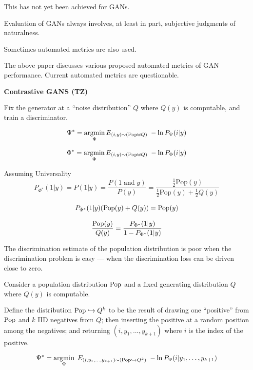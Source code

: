 {\vfill
This has not yet been achieved for GANs.

\vfill
Evaluation of GANs always involves, at least in part, subjective judgments of naturalness.

\vfill
Sometimes automated metrics are also used.

\vfill
The above paper discusses various proposed automated metrics of GAN performance.  Current automated metrics are questionable.

\slide{}
\vfill
\centerline{\bf Contrastive GANS (TZ)}
\vfill\vfill


Fix the generator at a ``noise distribution'' $Q$ where $Q(y)$ is computable, and train a discriminator.

\vfill
{\color{red} $$\Psi^* = \operatorname*{argmin}_\Psi E_{(i,y) \sim (\mathrm{Pop} \uplus Q)}\;-\ln P_\Psi(i|y)$$}


{\color{red} $$\Phi^* = \operatorname*{argmin}_\Phi E_{(i,y) \sim (\mathrm{Pop} \uplus Q)}\;-\ln P_\Phi(i|y)$$}

Assuming Universality
$$P_{\Phi^*}(1|y) = P(1|y) = \frac{P(1\;\mathrm{and}\; y)}{P(y)} = \frac{\frac{1}{2}\mathrm{Pop}(y)}{\frac{1}{2}\mathrm{Pop}(y) + \frac{1}{2}Q(y)}$$

\vfill
$$P_{\Phi^*}(1|y)(\mathrm{Pop}(y) + Q(y)) = \mathrm{Pop}(y)$$

\vfill
{\color{red} $$ \frac{\mathrm{Pop}(y)}{Q(y)} = \frac{P_{\Phi^*}(1|y)}{1-P_{\Phi^*}(1|y)}$$}


The discrimination estimate of the population distribution is poor when the discrimination problem is easy --- when the discrimination loss can be driven close to zero.


Consider a population distribution $\mathrm{Pop}$ and a fixed generating distribution $Q$ where $Q(y)$ is computable.

\vfill
Define the distribution {\color{red} $\mathrm{Pop}\hookrightarrow Q^k$} to be the result of drawing one ``positive'' from $\mathrm{Pop}$ and $k$ IID negatives from $Q$;
then inserting the positive at a random position among the negatives; and returning $(i,y_1,\ldots,y_{k+1})$ where
$i$ is the index of the positive.

{\color{red} $$\Psi^* = \operatorname*{argmin}_\Psi\; E_{(i,y_1,\ldots,y_{k+1})\sim (\mathrm{Pop}\hookrightarrow Q^k)} \;- \ln P_\Psi(i|y_1,\ldots,y_{k+1})$$}

}
